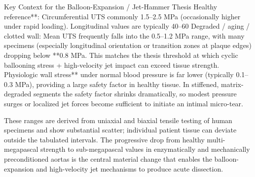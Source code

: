 Key Context for the Balloon-Expansion / Jet-Hammer Thesis
Healthy reference**: Circumferential UTS commonly 1.5–2.5 MPa (occasionally higher under rapid loading). Longitudinal values are typically 40–60 %
Degraded / aging / clotted wall: Mean UTS frequently falls into the 0.5–1.2 MPa range, with many specimens (especially longitudinal orientation or transition zones at plaque edges) dropping below **0.8 MPa. This matches the thesis threshold at which cyclic ballooning stress + high-velocity jet impact can exceed tissue strength.
Physiologic wall stress** under normal blood pressure is far lower (typically 0.1–0.3 MPa), providing a large safety factor in healthy tissue. In stiffened, matrix-degraded segments the safety factor shrinks dramatically, so modest pressure surges or localized jet forces become sufficient to initiate an intimal micro-tear.

These ranges are derived from uniaxial and biaxial tensile testing of human specimens and show substantial scatter; individual patient tissue can deviate outside the tabulated intervals. The progressive drop from healthy multi-megapascal strength to sub-megapascal values in enzymatically and mechanically preconditioned aortas is the central material change that enables the balloon-expansion and high-velocity jet mechanisms to produce acute dissection.
